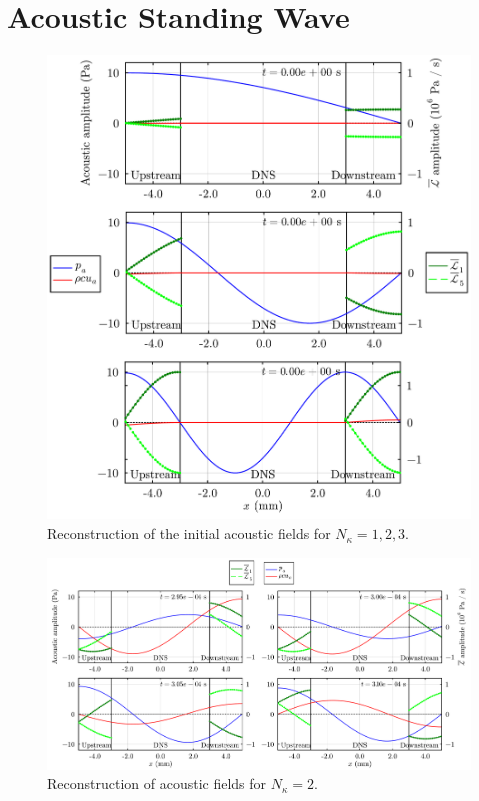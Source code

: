 \section{Acoustic Standing Wave}

\begin{figure}[t]
\centering
\includegraphics[scale=0.35]{assets/graphs/ac-plot-wave-modes.pdf}
\caption{Reconstruction of the initial acoustic fields for $N_κ = 1, 2, 3$.}
\label{fig:ac-wave-modes}
\end{figure}

\begin{figure}[t]
\centering
\includegraphics[scale=0.33]{assets/graphs/ac-plot-3-4_long.pdf}
\caption{Reconstruction of acoustic fields for $N_κ = 2$.}
\label{fig:ac-wave-later}
\end{figure}

